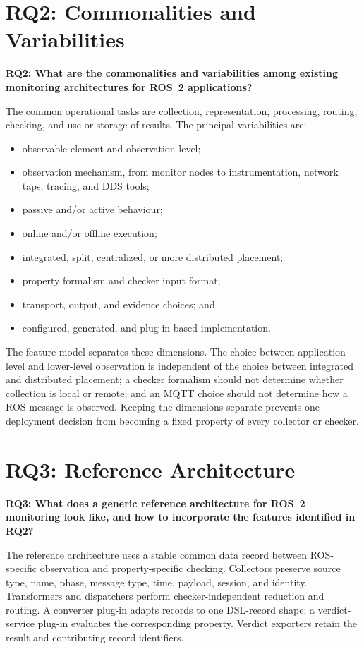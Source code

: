 \section{RQ2: Commonalities and Variabilities}

\textbf{RQ2: What are the commonalities and variabilities among existing
monitoring architectures for ROS~2 applications?}

The common operational tasks are collection, representation, processing,
routing, checking, and use or storage of results. The principal variabilities
are:

\begin{itemize}
  \item observable element and observation level;
  \item observation mechanism, from monitor nodes to instrumentation, network
  taps, tracing, and DDS tools;
  \item passive and/or active behaviour;
  \item online and/or offline execution;
  \item integrated, split, centralized, or more distributed placement;
  \item property formalism and checker input format;
  \item transport, output, and evidence choices; and
  \item configured, generated, and plug-in-based implementation.
\end{itemize}

The feature model separates these dimensions. 
The choice between application-level and lower-level observation is
independent of the choice between integrated and distributed placement; a
checker formalism should not determine whether collection is local or remote;
and an MQTT choice should not determine how a ROS message is observed.
Keeping the dimensions separate prevents one deployment decision from becoming
a fixed property of every collector or checker.

\section{RQ3: Reference Architecture}

\textbf{RQ3: What does a generic reference architecture for ROS~2 monitoring
look like, and how to incorporate the features identified in RQ2?}

The reference architecture uses a stable common data record between
ROS-specific observation and property-specific checking. Collectors preserve
source type, name, phase, message type, time, payload, session, and identity.
Transformers and dispatchers perform checker-independent reduction and routing.
A converter plug-in adapts records to one DSL-record shape; a verdict-service
plug-in evaluates the corresponding property. Verdict exporters retain the
result and contributing record identifiers.

